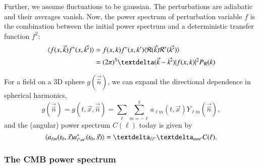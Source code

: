     Further, we assume fluctuations to be gaussian. The perturbations are adiabatic and their averages vanish. Now, the power spectrum of perturbation variable $f$ is the combination between the initial power spectrum and a deterministic transfer function $f^2$:
    \begin{equation}\label{mil4:theo:eq:defining_power_spectrum}
    \begin{split}
        \avg{f(x,\vec{k}) f^\ast(x,\vec{k'})} &= f(x,k)f^\ast(x,k') \avg{\mathcal{R}(\vec{k})\mathcal{R}^*(\vec{k'})} \\
        &= (2\pi)^3 \deltafunc{\vec{k}-\vec{k'}} \abs{f(x,k)}^2 P_\mathcal{R}(k)
    \end{split}
    \end{equation}


    For a field on a 3D sphere $g(\vec{\hat{n}})$, we can expand the directional dependence in spherical harmonics,
    \begin{equation}\label{mil4:theo:eq:spherical_harmonics_expansion}
        g(\vec{\hat{n}}) = g(t, \vec{x}, \vec{\hat{n}})=  \sum_{\ell} \sum_{m=-\ell}^{\ell} a_{\ell m}(t, \vec{x}) Y_{\ell m} (\vec{\hat{n}}),
    \end{equation}
    and the (angular) power spectrum $C(\ell)$ today is given by
    \begin{equation}\label{mil4:theo:eq:defining_angular_power_spectrum}
        \avg{a\ellm(t_0, \vec{x}) a^\ast\ellmp(t_0, \vec{x})}= \deltasym{\ell \ell'} \deltasym{m m'} C(\ell).
    \end{equation}



\subsubsection{The CMB power spectrum}

